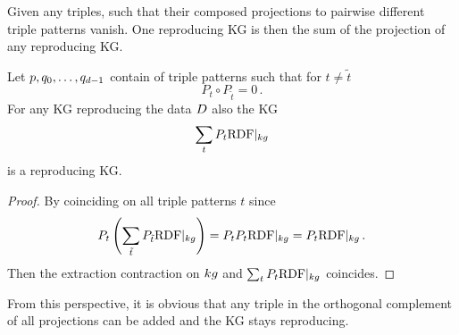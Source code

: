 
Given any triples, such that their composed projections to pairwise different triple patterns vanish. 
One reproducing KG is then the sum of the projection of any reproducing KG.



\begin{theorem}
	Let  $p,q_{0},\ldots,q_{d-1}$ contain of triple patterns such that for $t\neq \tilde{t}$
		\[ P_t \circ P_{\tilde{t}} = 0 \, . \]
	For any KG reproducing the data $D$ also the KG 
		\[ \sum_{t} P_t {\mathrm{RDF}}|_{kg} \]
	is a reproducing KG.
\end{theorem}
\begin{proof}
	By coinciding on all triple patterns $t$ since
		\[ P_t \left( \sum_{\tilde{t}} P_{\tilde{t}} {\mathrm{RDF}}|_{kg}  \right)  
		= P_t P_t {\mathrm{RDF}}|_{kg}  
		= P_t {\mathrm{RDF}}|_{kg}  \, .   \]
	Then the extraction contraction on $kg$ and $ \sum_{t} P_t{\mathrm{RDF}}|_{kg} $ coincides.
\end{proof}

From this perspective, it is obvious that any triple in the orthogonal complement of all projections can be added and the KG stays reproducing.


%
%







